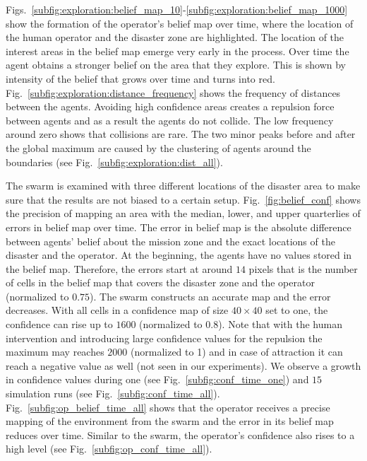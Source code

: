 \documentclass[runningheads]{llncs}%
\begin{document}
Figs.~\ref{subfig:exploration:belief_map_10}-\ref{subfig:exploration:belief_map_1000} show the formation of the operator's belief map over time, where the location of the human operator and the disaster zone are highlighted. The location of the interest areas in the belief map emerge very early in the process. Over time the agent obtains a stronger belief on the area that they explore. This is shown by intensity of the belief that grows over time and turns into red. Fig.~\ref{subfig:exploration:distance_frequency} shows the frequency of distances between the agents. Avoiding high confidence areas creates a repulsion force between agents and as a result the agents do not collide. The low frequency around zero shows that collisions are rare. The two minor peaks before and after the global maximum are caused by the clustering of agents around the boundaries (see Fig.~\ref{subfig:exploration:dist_all}). 

The swarm is examined with three different locations of the disaster area to make sure that the results are not biased to a certain setup. Fig.~\ref{fig:belief_conf} shows the precision of mapping an area with the median, lower, and upper quarterlies of errors in belief map over time. The error in belief map is the absolute difference between agents' belief about the mission zone and the exact locations of the disaster and the operator. At the beginning, the agents have no values stored in the belief map. Therefore, the errors start at around $14$ pixels that is the number of cells in the belief map that covers the disaster zone and the operator (normalized to $0.75$). The swarm constructs an accurate map and the error decreases. With all cells in a confidence map of size $40 \times 40$ set to one, the confidence can rise up to $1600$ (normalized to $0.8$). Note that with the human intervention and introducing large confidence values for the repulsion the maximum may reaches $2000$ (normalized to 1) and in case of attraction it can reach a negative value as well (not seen in our experiments). We observe a growth in confidence values during one (see Fig.~\ref{subfig:conf_time_one}) and {$15$} simulation runs (see Fig.~\ref{subfig:conf_time_all}). Fig.~\ref{subfig:op_belief_time_all} shows that the operator receives a precise mapping of the environment from the swarm and the error in its belief map reduces over time.  Similar to the swarm, the operator's confidence also rises to a high level (see Fig.~\ref{subfig:op_conf_time_all}).


\end{document}
